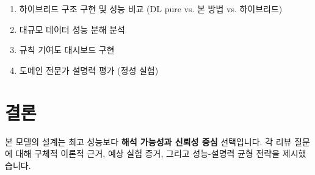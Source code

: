 \documentclass[11pt, twocolumn]{article}
\begin{document}
\begin{enumerate}
    \item 하이브리드 구조 구현 및 성능 비교 (DL pure vs. 본 방법 vs. 하이브리드)
    \item 대규모 데이터 성능 분해 분석
    \item 규칙 기여도 대시보드 구현
    \item 도메인 전문가 설명력 평가 (정성 실험)
\end{enumerate}

\section{결론}

본 모델의 설계는 최고 성능보다 \textbf{해석 가능성과 신뢰성 중심} 선택입니다. 
각 리뷰 질문에 대해 구체적 이론적 근거, 예상 실험 증거, 그리고 성능-설명력 균형 전략을 제시했습니다.
\end{document}
